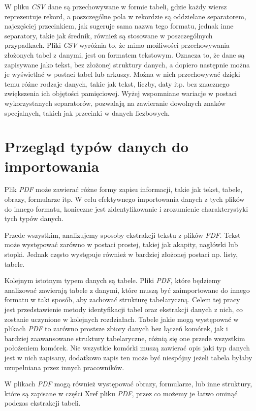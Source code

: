 \documentclass[a4paper,twoside,12pt]{book}
\begin{document}
W pliku \emph{CSV} dane są przechowywane w formie tabeli, gdzie każdy wiersz reprezentuje rekord, a poszczególne pola w rekordzie są oddzielane separatorem, najczęściej przecinkiem, jak sugeruje sama nazwa tego formatu, jednak inne separatory, takie jak średnik, również są stosowane w poszczególnych przypadkach. Pliki \emph{CSV} wyróżnia to, że mimo możliwości przechowywania złożonych tabel z danymi, jest on formatem tekstowym. Oznacza to, że dane są zapisywane jako tekst, bez złożonej struktury danych, a dopiero następnie można je wyświetlać w postaci tabel lub arkuszy. Można w nich przechowywać dzięki temu różne rodzaje danych, takie jak tekst, liczby, daty itp. bez znacznego zwiększenia ich objętości pamięciowej. Wyżej wspomniane wariacje w postaci wykorzystanych separatorów, pozwalają na zawieranie dowolnych znaków specjalnych, takich jak przecinki w danych liczbowych.

\section{Przegląd typów danych do importowania}

Plik \emph{PDF} może zawierać różne formy zapisu informacji, takie jak tekst, tabele, obrazy, formularze itp. W celu efektywnego importowania danych z tych plików do innego formatu, konieczne jest zidentyfikowanie i zrozumienie charakterystyki tych typów danych. 

Przede wszystkim, analizujemy sposoby ekstrakcji tekstu z plików \emph{PDF}. Tekst może występować zarówno w postaci prostej, takiej jak  akapity, nagłówki lub stopki. Jednak często występuje również w bardziej złożonej postaci np. listy, tabele.

Kolejnym istotnym typem danych są tabele. Pliki \emph{PDF}, które będziemy analizować zawierają tabele z danymi, które muszą być zaimportowane do innego formatu w taki sposób, aby zachować strukturę tabelaryczną. Celem tej pracy jest przedstawienie metody identyfikacji tabel oraz ekstrakcji danych z nich, co zostanie uczynione w kolejnych rozdziałach. Tabele jakie mogą występować w plikach \emph{PDF} to zarówno prostsze zbiory danych bez łączeń komórek, jak i bardziej zaawansowane struktury tabelaryczne, różnią się one przede wszystkim położeniem komórek. Nie wszystkie komórki muszą zawierać opis jaki typ danych jest w nich zapisany, dodatkowo zapis ten może być niespójny jeżeli tabela byłaby uzupełniana przez innych pracowników.

W plikach \emph{PDF} mogą również występować obrazy, formularze, lub inne struktury, które są zapisane w części Xref pliku \emph{PDF}, przez co możemy je łatwo ominąć podczas ekstrakcji tabeli.
\end{document}
